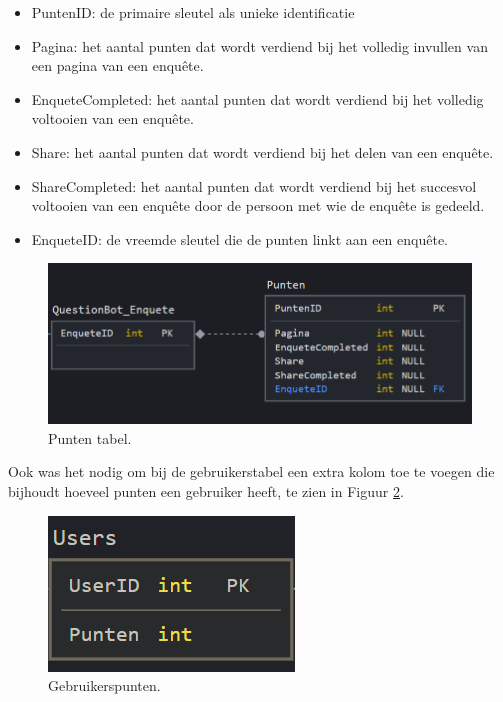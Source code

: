 \begin{itemize}
    \item PuntenID: de primaire sleutel als unieke identificatie
    \item Pagina: het aantal punten dat wordt verdiend bij het volledig invullen van een pagina van een enquête.
    \item EnqueteCompleted: het aantal punten dat wordt verdiend bij het volledig voltooien van een enquête.
    \item Share: het aantal punten dat wordt verdiend bij het delen van een enquête.
    \item ShareCompleted: het aantal punten dat wordt verdiend bij het succesvol voltooien van een enquête door de persoon met wie de enquête is gedeeld.
    \item EnqueteID: de vreemde sleutel die de punten linkt aan een enquête.
\end{itemize}

\begin{figure}
    \includegraphics[width=\linewidth]{PuntenDiagram.png}
    \caption{Punten tabel.}
    \label{fig:puntendiagram}
\end{figure}

Ook was het nodig om bij de gebruikerstabel een extra kolom toe te voegen die bijhoudt hoeveel punten een gebruiker heeft, te zien in Figuur \ref{fig:gebruikerpunten}.

\begin{figure}
    \includegraphics[width=\linewidth]{GebruikerPunten.png}
    \caption{Gebruikerspunten.}
    \label{fig:gebruikerpunten}
\end{figure}

